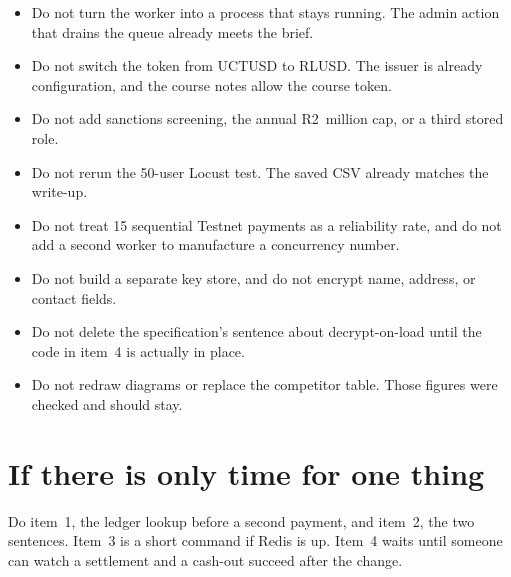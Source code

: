\documentclass[11pt,a4paper]{article}
\begin{document}
\begin{itemize}
\item Do not turn the worker into a process that stays running. The admin action that drains the queue already meets the brief.
\item Do not switch the token from UCTUSD to RLUSD. The issuer is already configuration, and the course notes allow the course token.
\item Do not add sanctions screening, the annual R2~million cap, or a third stored role.
\item Do not rerun the 50-user Locust test. The saved CSV already matches the write-up.
\item Do not treat 15 sequential Testnet payments as a reliability rate, and do not add a second worker to manufacture a concurrency number.
\item Do not build a separate key store, and do not encrypt name, address, or contact fields.
\item Do not delete the specification's sentence about decrypt-on-load until the code in item~4 is actually in place.
\item Do not redraw diagrams or replace the competitor table. Those figures were checked and should stay.
\end{itemize}

\section{If there is only time for one thing}

Do item~1, the ledger lookup before a second payment, and item~2, the two sentences. Item~3 is a short command if Redis is up. Item~4 waits until someone can watch a settlement and a cash-out succeed after the change.
\end{document}
